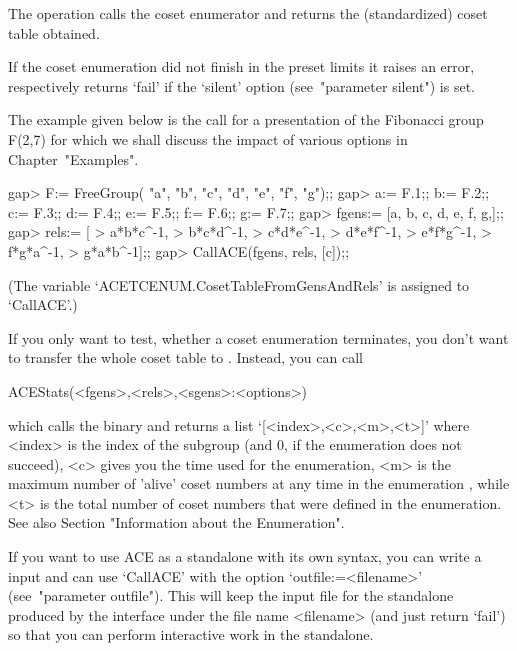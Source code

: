 The  operation  calls the  {\ACE}  coset  enumerator  and returns  the
(standardized) coset table obtained.

If the coset enumeration did not finish in the preset limits it raises
an  error,   respectively  returns  `fail'  if   the  `silent'  option
(see~"parameter silent") is set.

The  example  given  below is  the  call  for  a presentation  of  the
Fibonacci  group F(2,7)  for  which  we shall  discuss  the impact  of
various options in Chapter~"Examples".

\begintt
gap> F:= FreeGroup( "a", "b", "c", "d", "e", "f", "g");;
gap> a:= F.1;; b:= F.2;; c:= F.3;; d:= F.4;; e:= F.5;; f:= F.6;; g:= F.7;;
gap> fgens:= [a, b, c, d, e, f, g,];;
gap> rels:= [
> a*b*c^-1,
> b*c*d^-1,
> c*d*e^-1,
> d*e*f^-1,
> e*f*g^-1,
> f*g*a^-1,
> g*a*b^-1];;
gap> CallACE(fgens, rels, [c]);;
\endtt

(The  variable  `ACETCENUM.CosetTableFromGensAndRels'  is assigned  to
`CallACE'.)

If you only want to  test, whether a coset enumeration terminates, you
don't want to  transfer the whole coset table  to {\GAP}. Instead, you
can call

\>ACEStats(<fgens>,<rels>,<sgens>:<options>)

which    calls    the   {\ACE}    binary    and    returns   a    list
`[<index>,<c>,<m>,<t>]'  where <index>  is the  index of  the subgroup
(and $0$, if the enumeration does not succeed), <c> gives you the time
used for the  enumeration, <m> is the maximum  number of 'alive' coset
numbers at any time in the enumeration , while <t> is the total number
of  coset numbers  that  were  defined in  the  enumeration. See  also
Section "Information about the Enumeration".


If you want  to use ACE as  a standalone with its own  syntax, you can
write  a  {\GAP}   input  and  can  use  `CallACE'   with  the  option
`outfile:=<filename>' (see~"parameter  outfile").  This will  keep the
input file for the {\ACE}  standalone produced by the {\GAP} interface
under the  file name <filename> (and  just return `fail')  so that you
can perform  interactive work in the standalone.






